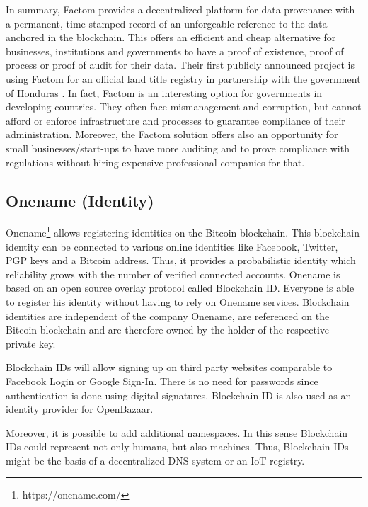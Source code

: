 In summary, Factom provides a decentralized platform for data provenance with a 
permanent, time-stamped record of an unforgeable reference to the data anchored 
in the blockchain. This offers an efficient and cheap alternative for businesses, 
institutions and governments to have a proof of existence, proof of process or 
proof of audit for their data. Their first publicly announced project is using 
Factom for an official land title registry in partnership with the government of 
Honduras \parencite{Chavez2015}. In fact, Factom is an interesting option for 
governments in developing countries. They often face mismanagement and corruption, 
but cannot afford or enforce infrastructure and processes to guarantee compliance 
of their administration. Moreover, the Factom solution offers also an opportunity 
for small businesses/start-ups to have more auditing and to prove compliance with 
regulations without hiring expensive professional companies for that.

\subsection{Onename (Identity)}
\label{sec:ecoonename}

Onename\footnote{https://onename.com/} allows registering identities on the Bitcoin blockchain. This blockchain 
identity can be connected to various online identities like Facebook, Twitter, 
PGP keys and a Bitcoin address. Thus, it provides a probabilistic identity which 
reliability grows with the number of verified connected accounts. Onename is based 
on an open source overlay protocol called Blockchain ID. Everyone is able to register 
his identity without having to rely on Onename services. Blockchain identities 
are independent of the company Onename, are referenced on the Bitcoin blockchain 
and are therefore owned by the holder of the respective private key.

Blockchain IDs will allow signing up on third party websites comparable to Facebook 
Login or Google Sign-In. There is no need for passwords since authentication is 
done using digital signatures. Blockchain ID is also used as an identity provider 
for OpenBazaar. 

Moreover, it is possible to add additional namespaces. In this sense Blockchain 
IDs could represent not only humans, but also machines. Thus, Blockchain IDs might 
be the basis of a decentralized DNS system or an IoT registry. 

